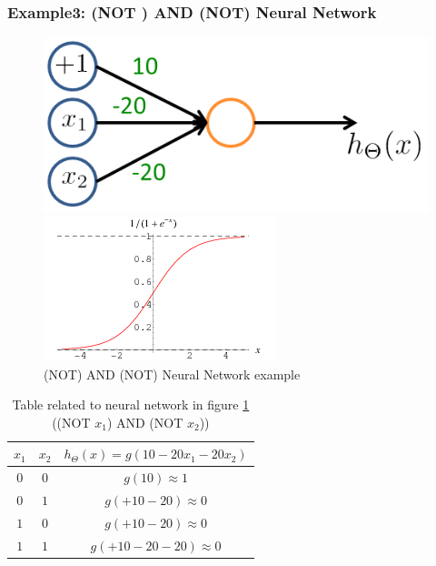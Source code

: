 \begin{mdframed}[style=MyFrame]
\subsubsection{ Example3:  (NOT ) AND (NOT) Neural Network}



\begin{figure}[H]
	\centering
	\begin{minipage}[c]{.46\textwidth}
		\centering
		\includegraphics[scale=0.35]{images/notx1andnotx2}		
	\end{minipage}%
	\hspace{4mm}%
	\begin{minipage}[c]{.46\textwidth}
		\centering
		\includegraphics[scale=0.55]{images/sigmoidplot}
	\end{minipage}
	\caption{(NOT) AND (NOT) Neural Network example}\label{fig:notx1andnotx2}
\end{figure}

\begin{table}[H]
\caption{Table related to neural network in figure \ref{fig:notx1andnotx2} ((NOT $x_1$) AND (NOT $x_2$)) }
\centering
\begin{tabular}{c c c }
\hline\hline
$x_1$	&	$x_2$ & $h_{\Theta}(x) = g(10 - 20x_1 - 20x_2 )$  \\ [0.5ex] %
\hline
$0$ &	$0$	& $g(10) \approx 1$ \\
$0$ &	$1$	& $g(+10 - 20) \approx 0$ \\
$1$ &	$0$	& $g(+10 - 20) \approx 0$ \\
$1$ &	$1$	& $g(+10 - 20 - 20) \approx 0$ \\
\hline
\end{tabular}
\label{table:nov-ser}
\end{table}
\end{mdframed}



